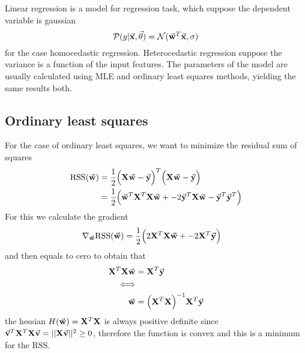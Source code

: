 \documentclass[../main.tex]{subfiles}
\begin{document}
Linear regression is a model for regression task, which suppose the dependent variable is gaussian
\begin{equation*}
    \p(y|\vec{x},\vec{\theta}) = \normal(\vec{w}^T\vec{x},\sigma)
\end{equation*}
for the case homocedastic regression. Heterocedastic regression suppose the variance is a function of the input features. The parameters of the model are usually calculated using MLE and ordinary least squares methods, yielding the same results both. 
\subsection{Ordinary least squares}
For the case of ordinary least squares, we want to minimize the residual sum of squares
\begin{align*}
    \text{RSS}(\vec{w})
    &=\frac{1}{2}\Big(\mat{X}\vec{w}-\vec{y}\Big)^T \Big(\mat{X}\vec{w}-\vec{y}\Big)\\
    &=\frac{1}{2}\Big(
        \vec{w}^T\mat{X}^T\mat{X}\vec{w}+
        -2\vec{y}^T\mat{X}\vec{w}-\vec{y}^T\vec{y}^T
    \Big)\\
\end{align*}
For this we calculate the gradient
\begin{align*}
    \nabla_{\vec{w}} \text{RSS}(\vec{w})
    &=\frac{1}{2}\Big(
        2\mat{X}^T\mat{X}\vec{w}+
        -2\mat{X}^T\vec{y}\Big)
\end{align*}
and then equals to cero to obtain that
\begin{align*}
    \mat{X}^T\mat{X}\vec{w} &= \mat{X}^T\vec{y}\\ 
    \Longleftrightarrow&\\
    \vec{w} &= \Big(\mat{X}^T\mat{X}\Big)^{-1}\mat{X}^T\vec{y}
\end{align*}
the hessian $H(\vec{w})=\mat{X}^T\mat{X}$ is always positive definite since $\vec{v}^T\mat{X}^T\mat{X}\vec{v}=||\mat{X}\vec{v}||^2\ge0$, therefore the function is convex and this is a minimum for the $\text{RSS}$.
\end{document}
